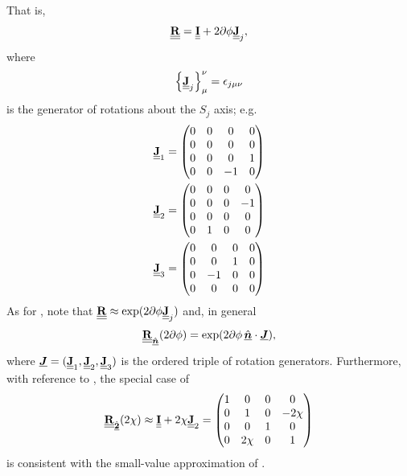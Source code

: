 %
That is,
%
\begin{equation}
    \label{eqn:small_rotation_basis_Mueller}
    \underline{\underline{{\bf R}}} = \underline{\underline{{\bf I}}} + 2\partial\phi \underline{\underline{{\bf J}}}_j,
\end{equation}
where 
%
%
\begin{equation} \label{eqn:rotation_generator_Mueller_index}
    \left\{ \underline{\underline{{\bf J}}}_j \right\}_\mu^\nu = \epsilon_{j \mu \nu}
\end{equation}
%
%
is the generator of rotations about the $S_j$ axis; e.g.
\begin{align}
\underline{\underline{{\bf J}}}_1 &= \begin{pmatrix} 0 & 0 & 0 & 0 \\ 0 & 0 & 0 & 0 \\ 0 & 0 & 0 & 1 \\ 0 & 0 & -1 & 0 \end{pmatrix}\\
\underline{\underline{{\bf J}}}_2 &= \begin{pmatrix} 0 & 0 & 0 & 0 \\ 0 & 0 & 0 & -1 \\ 0 & 0 & 0 & 0 \\ 0 & 1 & 0 & 0 \end{pmatrix}\\
\underline{\underline{{\bf J}}}_3 &= \begin{pmatrix} 0 & 0 & 0 & 0 \\ 0 & 0 & 1 & 0 \\ 0 & -1 & 0 & 0 \\ 0 & 0 & 0 & 0 \end{pmatrix}
\end{align}
%
As for , note that $\underline{\underline{{\bf R}}} \approx \exp(2\partial\phi \underline{\underline{{\bf J}}}_j)$ and,
in general
\begin{equation}
    \label{eqn:rotation_Mueller_exponential}
	\underline{\underline{{\bf R}}}_{\hat{\underline{\mbox{\scriptsize\boldmath $n$}}}}(2\partial\phi) = \exp(2\partial\phi \, {\hat{\underline{\mbox{\boldmath $n$}}}} \cdot \underline{\mbox{\boldmath $J$}}),
\end{equation}
where $\underline{\mbox{\boldmath $J$}}=(\underline{\underline{{\bf J}}}_1, \underline{\underline{{\bf J}}}_2, \underline{\underline{{\bf J}}}_3)$ is the ordered triple of rotation generators.
%
Furthermore, with reference to , the special case of
\begin{equation}
    \underline{\underline{{\bf R}}}_{\hat{\underline{\mbox{\scriptsize\boldmath $2$}}}}(2\chi) \approx \underline{\underline{{\bf I}}} + 2\chi \underline{\underline{{\bf J}}}_2 = \begin{pmatrix} 1 & 0 & 0 & 0 \\ 0 & 1 & 0 & -2\chi \\ 0 & 0 & 1 & 0 \\ 0 & 2\chi & 0 & 1 \end{pmatrix}
\end{equation}
is consistent with the small-value approximation of .
%

